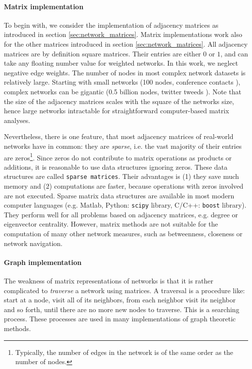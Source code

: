 \documentclass[openright,twoside,headsepline]{scrbook}
\begin{document}
\paragraph{Matrix implementation\color{Cayenne}{.}}
To begin with, we consider the implementation of adjacency matrices as introduced in section \ref{sec:network_matrices}.
Matrix implementations work also for the other matrices introduced in section \ref{sec:network_matrices}.
All adjacency matrices are by definition square matrices.
Their entries are either $0$ or $1$, and can take any floating number value for weighted networks.
In this work, we neglect negative edge weights.
The number of nodes in most complex network datasets is relatively large. 
Starting with small networks (100 nodes, conference contacts \citep{isella2011}), complex networks can be gigantic (0.5 billion nodes, twitter tweeds \citep{Yang:2011}).
Note that the size of the adjacency matrices scales with the square of the networks size, hence large networks intractable for straightforward computer-based matrix analyses.

Nevertheless, there is one feature, that most adjacency matrices of real-world networks have in common:
they are \emph{sparse}, i.e. the vast majority of their entries are zeros\footnote{Typically, the number of edges in the network is of the same order as the number of nodes.}.
Since zeros do not contribute to matrix operations as products or additions, it is reasonable to use data structures ignoring zeros.
These data structures are called \verb"sparse matrices".
Their advantages is (1) they save much memory and (2) computations are faster, because operations with zeros involved are not executed.
Sparse matrix data structures are available in most modern computer languages (e.g. Matlab, Python: \verb"scipy" library, C/C++: \verb"boost" library).
They perform well for all problems based on adjacency matrices, e.g. degree or eigenvector centrality.
However, matrix methods are not suitable for the computation of many other network measures, such as betweenness, closeness or network navigation.

\paragraph{Graph implementation\color{Cayenne}{.}}
The weakness of matrix representations of networks is that it is rather complicated to \emph{traverse} a network using matrices.
A traversal is a procedure like: start at a node, visit all of its neighbors, from each neighbor visit its neighbor and so forth, until there are no more new nodes to traverse.
This is a searching process.
These processes are used in many implementations of graph theoretic methods.
\end{document}

